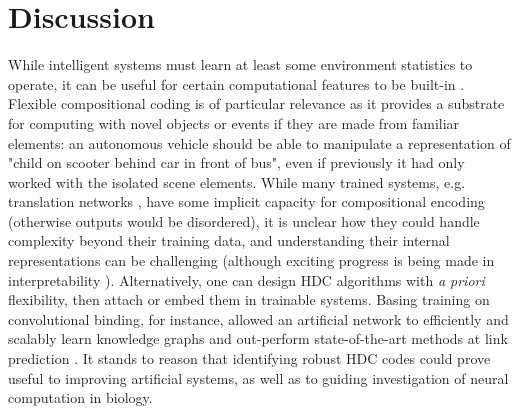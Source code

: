 \documentclass{article}
\begin{document}
\section{Discussion}

While intelligent systems must learn at least some environment statistics to operate, it can be useful for certain computational features to be built-in \cite{Zador:2019}. Flexible compositional coding is of particular relevance as it provides a substrate for computing with novel objects or events if they are made from familiar elements: an autonomous vehicle should be able to manipulate a representation of "child on scooter behind car in front of bus", even if previously it had only worked with the isolated scene elements. While many trained systems, e.g. translation networks \cite{Bahdanau:2014, Luong:2015, Wu:2016}, have some implicit capacity for compositional encoding (otherwise outputs would be disordered), it is unclear how they could handle complexity beyond their training data, and understanding their internal representations can be challenging \cite{Lipton:2016} (although exciting progress is being made in interpretability \cite{Zeiler:2014, Montavon:2018}). Alternatively, one can design HDC algorithms with \textit{a priori} flexibility, then attach or embed them in trainable systems. Basing training on convolutional binding, for instance, allowed an artificial network to efficiently and scalably learn knowledge graphs and out-perform state-of-the-art methods at link prediction \cite{Nickel:2016}. It stands to reason that identifying robust HDC codes could prove useful to improving artificial systems, as well as to guiding investigation of neural computation in biology.
\end{document}
